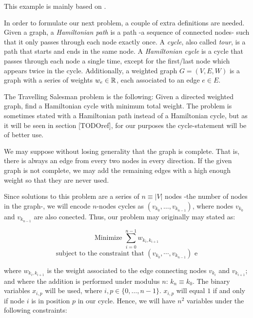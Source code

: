 This example is mainly based on \cite{Glover2019}.

In order to formulate our next problem, a couple of extra definitions are needed. Given a graph, a \emph{Hamiltonian path} is a path -a sequence of connected nodes- such that it only passes through each node exactly once. A \emph{cycle}, also called \emph{tour}, is a path that starts and ends in the same node. A \emph{Hamiltonian cycle} is a cycle that passes through each node a single time, except for the first/last node which appears twice in the cycle. Additionally, a weighted graph $G =(V, E, W)$ is a graph with a series of weights $w_e \in \mathbb{R}$, each associated to an edge $e \in E$.

The Travelling Salesman problem is the following: Given a directed weighted graph, find a Hamiltonian cycle with minimum total weight. The problem is sometimes stated with a Hamiltonian path instead of a Hamiltonian cycle, but as it will be seen in section [TODOref], for our purposes the cycle-statement will be of better use.

We may suppose without losing generality that the graph is complete. That is, there is always an edge from every two nodes in every direction. If the given graph is not complete, we may add the remaining edges with a high enough weight so that they are never used.

Since solutions to this problem are a series of $n \equiv |V|$ nodes -the number of nodes in the graph-, we will encode $n$-nodes cycles as $(v_{k_0}, \ldots, v_{k_{n-1}})$, where nodes $v_{k_0}$ and $v_{k_{n-1}}$ are also conected. Thus, our problem may originally may stated as:

$$ \text{Minimize } \sum_{i=0}^{n-1} w_{k_i, k_{i+1}} $$
$$ \text{subject to the constraint that } (v_{k_0}, \cdots, v_{k_{n-1}}) \text{ e}$$

where $w_{k_i, k_{i+1}}$ is the weight associated to the edge connecting nodes $v_{k_i}$ and $v_{k_{i+1}}$; and where the addition is performed under modulus $n$: $k_n \equiv k_0$. The binary variables $x_{i,p}$ will be used, where $i,p \in \{0, \ldots, n-1\}$. $x_{i,p}$ will equal $1$ if and only if node $i$ is in position $p$ in our cycle. Hence, we will have $n^2$ variables under the following constraints:

